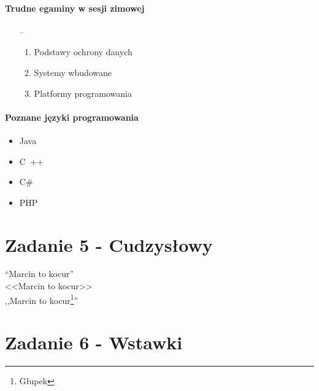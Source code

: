 \documentclass{article}
\begin{document}
\paragraph{Trudne egaminy w sesji zimowej}
\begin{enumerate}
    \item[--]
    \begin{enumerate}
        \item Podstawy ochrony danych
        \item Systemy wbudowane
        \item Platformy programowania
    \end{enumerate}
\end{enumerate}

\paragraph{Poznane języki programowania}
\begin{itemize}
    \item Java
    \item C~++
    \item C\#
    \item PHP
\end{itemize}
\section{Zadanie 5 - Cudzysłowy}
``Marcin to kocur''~\\
<<Marcin to kocur>>~\\
,,Marcin to kocur\footnote{Głupek}''~\\

\section{Zadanie 6 - Wstawki}
\end{document}

